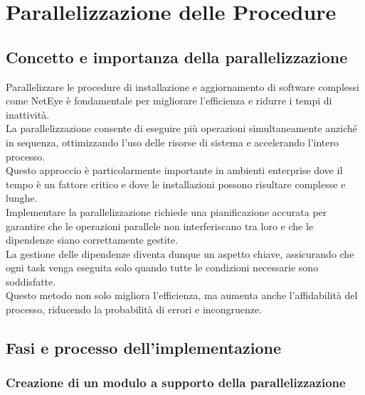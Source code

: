 \chapter{Parallelizzazione delle Procedure}
\label{cha:parallelizzazione}

\section{Concetto e importanza della parallelizzazione}
\label{sec:introduzione_parallelizzazione}

Parallelizzare le procedure di installazione e aggiornamento di software complessi
come NetEye è fondamentale per migliorare l'efficienza e ridurre i tempi di inattività.\\
La parallelizzazione consente di eseguire più operazioni simultaneamente anziché
in sequenza, ottimizzando l'uso delle risorse di sistema e accelerando l'intero
processo.\\ Questo approccio è particolarmente importante in ambienti enterprise
dove il tempo è un fattore critico e dove le installazioni possono risultare
complesse e lunghe.\\ Implementare la parallelizzazione richiede una
pianificazione accurata per garantire che le operazioni parallele non
interferiscano tra loro e che le dipendenze siano correttamente gestite.\\ La
gestione delle dipendenze diventa dunque un aspetto chiave, assicurando che ogni
task venga eseguita solo quando tutte le condizioni necessarie sono soddisfatte.\\
Questo metodo non solo migliora l'efficienza, ma aumenta anche l'affidabilità
del processo, riducendo la probabilità di errori e incongruenze.

\section{Fasi e processo dell'implementazione}
\label{sec:fasi_parallelizzazione}

\subsection{Creazione di un modulo a supporto della parallelizzazione}
\label{sub:modulo_parallelizzazione}

